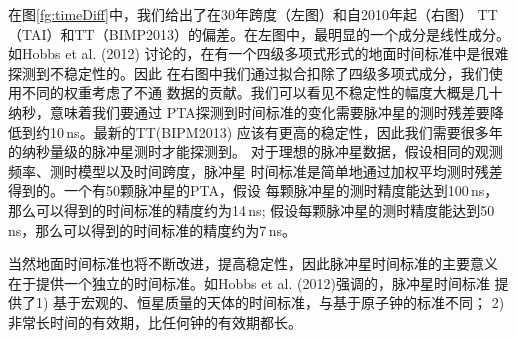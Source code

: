 在图\ref{fg:timeDiff}中，我们给出了在30年跨度（左图）和自2010年起（右图）
TT（TAI）和TT（BIMP2013）的偏差。在左图中，最明显的一个成分是线性成分。如Hobbs et al. (2012)\supercite{hcm+12}
讨论的，在有一个四级多项式形式的地面时间标准中是很难探测到不稳定性的。因此
在右图中我们通过拟合扣除了四级多项式成分，我们使用不同的权重考虑了不通
数据的贡献。我们可以看见不稳定性的幅度大概是几十纳秒，意味着我们要通过
PTA探测到时间标准的变化需要脉冲星的测时残差要降低到约10\,ns。最新的TT(BIPM2013)
应该有更高的稳定性，因此我们需要很多年的纳秒量级的脉冲星测时才能探测到。
对于理想的脉冲星数据，假设相同的观测频率、测时模型以及时间跨度，脉冲星
时间标准是简单地通过加权平均测时残差得到的。一个有50颗脉冲星的PTA，假设
每颗脉冲星的测时精度能达到100\,ns，那么可以得到的时间标准的精度约为14\,ns;
假设每颗脉冲星的测时精度能达到50\,ns，那么可以得到的时间标准的精度约为7\,ns。

当然地面时间标准也将不断改进，提高稳定性，因此脉冲星时间标准的主要意义
在于提供一个独立的时间标准。如Hobbs et al. (2012)强调的，脉冲星时间标准
提供了1) 基于宏观的、恒星质量的天体的时间标准，与基于原子钟的标准不同；
2) 非常长时间的有效期，比任何钟的有效期都长。

